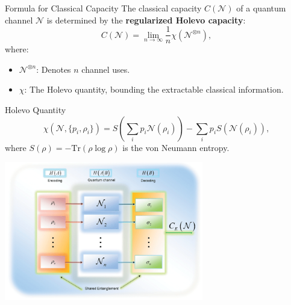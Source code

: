 \begin{frame}{Formula for Classical Capacity}
    The classical capacity \( C(\mathcal{N}) \) of a quantum channel \( \mathcal{N} \) is determined by the \textbf{regularized Holevo capacity}:
    \begin{equation}
        C(\mathcal{N}) = \lim_{n \to \infty} \frac{1}{n} \chi\left(\mathcal{N}^{\otimes n}\right),
    \end{equation}
    where:
    \begin{itemize}
        \item \( \mathcal{N}^{\otimes n} \): Denotes \( n \) channel uses.
        \item \( \chi \): The Holevo quantity, bounding the extractable classical information.
    \end{itemize}

    \begin{block}{Holevo Quantity}
        \[
        \chi(\mathcal{N}, \{p_i, \rho_i\}) = S\left(\sum_i p_i \mathcal{N}(\rho_i)\right) - \sum_i p_i S\left(\mathcal{N}(\rho_i)\right),
        \]
        where \( S(\rho) = -\text{Tr}(\rho \log \rho) \) is the von Neumann entropy.
    \end{block}

    \begin{center}
        \includegraphics[width=0.65\textwidth]{figures/classical_cap.png}
    \end{center}
\end{frame}
